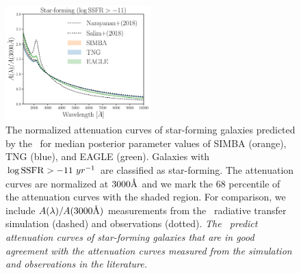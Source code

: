 \begin{figure}
\begin{center}
    \includegraphics[width=0.5\textwidth]{figs/abc_sf_attenuation.pdf}
    \caption{\label{fig:sfatten}
    The normalized attenuation curves of star-forming galaxies predicted by
    the \eda~for median posterior parameter values of SIMBA (orange), TNG
    (blue), and EAGLE (green).  
    Galaxies with $\log {\rm SSFR} > -11~yr^{-1}$ are classified as star-forming. 
    The attenuation curves are normalized at $3000\AA$ and we mark the
    68 percentile of the attenuation curves with the shaded region.
    For comparison, we include $A(\lambda)/A(3000\AA)$ measurements from
    the~\cite{narayanan2018} radiative transfer simulation (dashed) and
    \cite{salim2018} observations (dotted).
    {\em The \eda~predict attenuation curves of star-forming galaxies that
    are in good agreement with the attenuation curves measured from
    the simulation and observations in the literature.}
    }
\end{center}
\end{figure}

